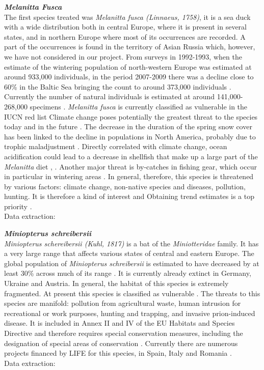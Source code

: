 \documentclass[12pt,a4paper]{article}
\begin{document}
\bigskip
{\noindent \textbf{\textit{Melanitta Fusca}}} 
\\
The first species treated was \textit{Melanitta fusca (Linnaeus, 1758)}, it is a sea duck with a wide distribution both in central Europe, where it is present in several states, and in northern Europe where most of its occurrences are recorded.
A part of the occurrences is found in the territory of Asian Russia which, however, we have not considered in our project.
From surveys in 1992-1993, when the estimate of the wintering population of north-western Europe was estimated at around 933,000 individuals, in the period 2007-2009 there was a decline close to 60\% in the Baltic Sea bringing the count to around 373,000 individuals \citep{skov}.
Currently the number of natural individuals is estimated at around 141,000-268,000 specimens \citep{IUCN}.
\textit{Melanitta fusca} is currently classified as vulnerable in the IUCN red list \citep{IUCN}
Climate change poses potentially the greatest threat to the species today and in the future \citep{IUCN}. The decrease in the duration of the spring snow cover has been linked to the decline in populations in North America, probably due to trophic maladjustment \citep{drever}.
Directly correlated with climate change, ocean acidification could lead to a decrease in shellfish that make up a large part of the \textit{Melanitta} diet \citep{stein}, \citep{carb}.
Another major threat is by-catches in fishing gear, which occur in particular in wintering areas \citep*{dagys}.
In general, therefore, this species is threatened by various factors: climate change, non-native species and diseases, pollution, hunting.
It is therefore a kind of interest and Obtaining trend estimates is a top priority \citep{IUCN}.\\
Data extraction: \citep{mela}

\bigskip
{\noindent \textbf{\textit{Miniopterus schreibersii}}} 
\\
\textit{Miniopterus schereibersii (Kuhl, 1817)} is a bat of the \textit{Miniotteridae} family.
It has a very large range that affects various states of central and eastern Europe.
The global population of \textit{Miniopterus schreibersii} is estimated to have decreased by at least 30\% across much of its range \citep{IUCN}. It is currently already extinct in Germany, Ukraine and Austria. In general, the habitat of this species is extremely fragmented. At present this species is classified as vulnerable \citep{IUCN}.
The threats to this species are manifold: pollution from agricultural waste, human intrusion for recreational or work purposes, hunting and trapping, and invasive prion-induced disease.
It is included in Annex II and IV of the EU Habitats and Species Directive and therefore requires special conservation measures, including the designation of special areas of conservation \citep{dir}.
Currently there are numerous projects financed by LIFE for this species, in Spain, Italy and Romania \citep{IUCN}.\\
Data extraction: \citep{minio}
\end{document}
